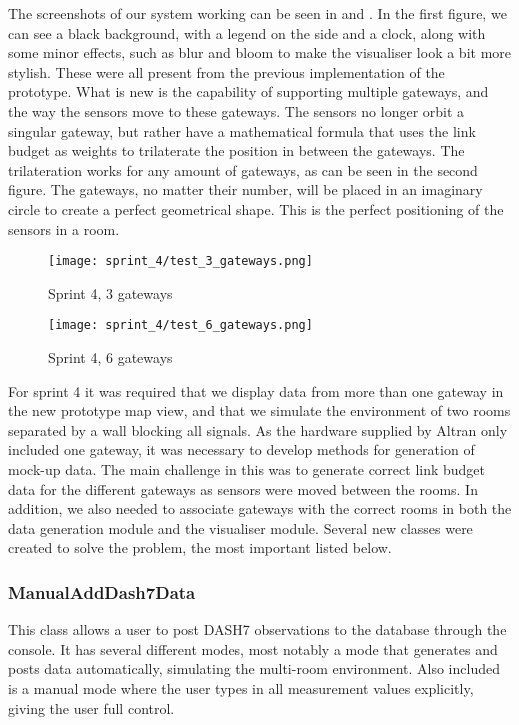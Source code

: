 \documentclass[../document]{subfiles}
\begin{document}
The screenshots of our system working can be seen in  and  . In the first figure, we can see a black background, with a legend on the side and a clock, along with some minor effects, such as blur and bloom to make the visualiser look a bit more stylish. These were all present from the previous implementation of the prototype. What is new is the capability of supporting multiple gateways, and the way the sensors move to these gateways. The sensors no longer orbit a singular gateway, but rather have a mathematical formula that uses the link budget as weights to trilaterate the position in between the gateways. The trilateration works for any amount of gateways, as can be seen in the second figure. The gateways, no matter their number, will be placed in an imaginary circle to create a perfect geometrical shape. This is the perfect positioning of the sensors in a room.

\begin{figure}[H]
\centering
\texttt{[image: sprint\_4/test\_3\_gateways.png]}
\caption{Sprint 4, 3 gateways}
\label{fig:sprint4_1}
\end{figure}

\begin{figure}[H]
\centering
\texttt{[image: sprint\_4/test\_6\_gateways.png]}
\caption{Sprint 4, 6 gateways}
\label{fig:sprint4_2}
\end{figure}

For sprint 4 it was required that we display data from more than one gateway in the new prototype map view, and that we simulate the environment of two rooms separated by a wall blocking all signals. As the hardware supplied by \gls{Altran} only included one gateway, it was necessary to develop methods for generation of mock-up data. The main challenge in this was to generate correct link budget data for the different gateways as sensors were moved between the rooms. In addition, we also needed to associate gateways with the correct rooms in both the data generation module and the visualiser module. Several new classes were created to solve the problem, the most important listed below.

\subsubsection{ManualAddDash7Data}
This class allows a user to post \gls{DASH7} observations to the database through the console. It has several different modes, most notably a mode that generates and posts data automatically, simulating the multi-room environment. Also included is a manual mode where the user types in all measurement values explicitly, giving the user full control.
\end{document}
